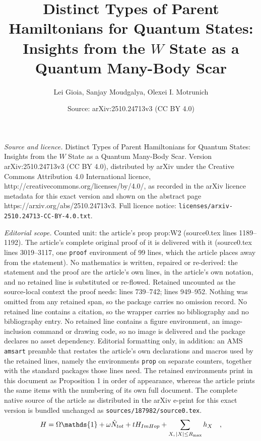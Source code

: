 \documentclass[10pt,a4paper]{amsart}
\title{Distinct Types of Parent Hamiltonians for Quantum States:\\ Insights from the $W$ State as a Quantum Many-Body Scar}
\author{Lei Gioia, Sanjay Moudgalya, Olexei I. Motrunich}
\date{Source: arXiv:2510.24713v3 (CC BY 4.0)}
\begin{document}
\maketitle

\noindent\emph{Source and licence.} Distinct Types of Parent Hamiltonians for Quantum States:\\ Insights from the $W$ State as a Quantum Many-Body Scar. Version arXiv:2510.24713v3 (CC BY 4.0), distributed by arXiv under the Creative Commons Attribution 4.0 International licence, http://creativecommons.org/licenses/by/4.0/, as recorded in the arXiv licence metadata for this exact version and shown on the abstract page https://arxiv.org/abs/2510.24713v3. Full licence notice: \texttt{licenses/arxiv-2510.24713-CC-BY-4.0.txt}.\par\smallskip

\noindent\textit{Editorial scope.} Counted unit: the article's prop prop:W2 (source0.tex lines 1189--1192). The article's complete original proof of it is delivered with it (source0.tex lines 3019--3117, one \texttt{proof} environment of 99 lines, which the article places away from the statement). No mathematics is written, repaired or re-derived: the statement and the proof are the article's own lines, in the article's own notation, and no retained line is substituted or re-flowed.  Retained uncounted as the source-local context the proof needs: lines 739--742; lines 949--952.  Nothing was omitted from any retained span, so the package carries no omission record.  No retained line contains a citation, so the wrapper carries no bibliography and no bibliography entry.  No retained line contains a figure environment, an image-inclusion command or drawing code, so no image is delivered and the package declares no asset dependency.  Editorial formatting only, in addition: an AMS \texttt{amsart} preamble that restates the article's own declarations and macros used by the retained lines, namely the environments \texttt{prop} on separate counters, together with the standard packages those lines need.  The retained environments print in this document as Proposition 1 in order of appearance, whereas the article prints the same items with the numbering of its own full document.  The complete native source of the article as distributed in the arXiv e-print for this exact version is bundled unchanged as \texttt{sources/187982/source0.tex}.
\begin{align}
    H =  \Omega \mathds{1} + \omega \hat{N}_{\rm tot} + t H_{\rm ImHop} + \sum_{X,\,|X|\leq R_{\text{max}}} h_X \quad,
    \label{eq:HW}
\end{align}
\end{document}
